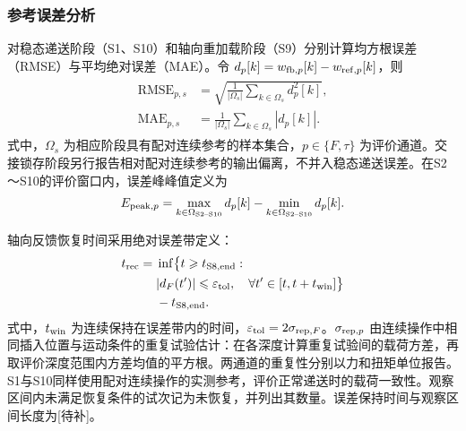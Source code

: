 \documentclass{JQR_LaTeX_Template-0507/JQRnew}
\providecommand{\RevisionColor}{\color{black}}
\newcommand{\revbegin}{\begingroup\RevisionColor}
\newcommand{\revend}{\par\endgroup}
\begin{document}
\subsubsection{参考误差分析}

\revbegin
对稳态递送阶段（S1、S10）和轴向重加载阶段（S9）分别计算均方根误差（RMSE）与平均绝对误差（MAE）。令 $d_p[k]=w_{{\rm fb},p}[k]-w_{{\rm ref},p}[k]$，则
\begin{align}
\label{eq:rmse-mae}
\begin{aligned}
\mathrm{RMSE}_{p,s}&=\sqrt{\frac{1}{|\Omega_s|}\sum_{k\in\Omega_s}d_p^2[k]},\\
\mathrm{MAE}_{p,s}&=\frac{1}{|\Omega_s|}\sum_{k\in\Omega_s}|d_p[k]|.
\end{aligned}
\end{align}
式中，$\Omega_s$ 为相应阶段具有配对连续参考的样本集合，$p\in\{F,\tau\}$ 为评价通道。交接锁存阶段另行报告相对配对连续参考的输出偏离，不并入稳态递送误差。在S2～S10的评价窗口内，误差峰峰值定义为
\begin{align}
\label{eq:peak-error}
E_{{\rm peak},p}=
\max_{k\in\Omega_{\rm S2\text{--}S10}}d_p[k]
-\min_{k\in\Omega_{\rm S2\text{--}S10}}d_p[k].
\end{align}
\revend

轴向反馈恢复时间采用绝对误差带定义：
\begin{align}
\label{eq:recovery-time}
\begin{aligned}
t_{\rm rec}={}&\inf\bigl\{t\ge t_{\rm S8,end}:\\
&|d_F(t')|\le\varepsilon_{\rm tol},\quad
\forall t'\in[t,t+t_{\rm win}]\bigr\}\\
&-t_{\rm S8,end}.
\end{aligned}
\end{align}
式中，$t_{\rm win}$ 为连续保持在误差带内的时间，$\varepsilon_{\rm tol}=2\sigma_{{\rm rep},F}$。$\sigma_{{\rm rep},p}$ 由连续操作中相同插入位置与运动条件的重复试验估计：在各深度计算重复试验间的载荷方差，再取评价深度范围内方差均值的平方根。两通道的重复性分别以力和扭矩单位报告。S1与S10同样使用配对连续操作的实测参考，评价正常递送时的载荷一致性。观察区间内未满足恢复条件的试次记为未恢复，并列出其数量。误差保持时间与观察区间长度为[待补]。
\end{document}
